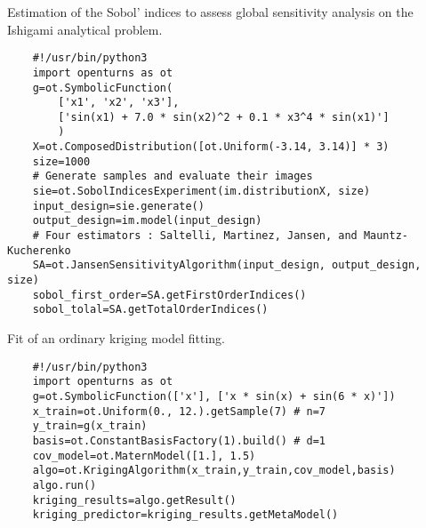 \begin{otexample_apx}
    Estimation of the Sobol' indices to assess global sensitivity analysis on the Ishigami analytical problem. 
    \lstset{style=mystyle, language=python}
%
\begin{lstlisting}
    #!/usr/bin/python3
    import openturns as ot
    g=ot.SymbolicFunction(
        ['x1', 'x2', 'x3'], 
        ['sin(x1) + 7.0 * sin(x2)^2 + 0.1 * x3^4 * sin(x1)']
        )
    X=ot.ComposedDistribution([ot.Uniform(-3.14, 3.14)] * 3)
    size=1000
    # Generate samples and evaluate their images
    sie=ot.SobolIndicesExperiment(im.distributionX, size)
    input_design=sie.generate()
    output_design=im.model(input_design)
    # Four estimators : Saltelli, Martinez, Jansen, and Mauntz-Kucherenko
    SA=ot.JansenSensitivityAlgorithm(input_design, output_design, size)
    sobol_first_order=SA.getFirstOrderIndices()
    sobol_tolal=SA.getTotalOrderIndices()
\end{lstlisting}
%
\end{otexample_apx}



\begin{otexample_apx}
    Fit of an ordinary kriging model fitting. 
    \lstset{style=mystyle, language=python}
%
\begin{lstlisting}
    #!/usr/bin/python3
    import openturns as ot
    g=ot.SymbolicFunction(['x'], ['x * sin(x) + sin(6 * x)'])
    x_train=ot.Uniform(0., 12.).getSample(7) # n=7
    y_train=g(x_train)
    basis=ot.ConstantBasisFactory(1).build() # d=1
    cov_model=ot.MaternModel([1.], 1.5)
    algo=ot.KrigingAlgorithm(x_train,y_train,cov_model,basis)
    algo.run()
    kriging_results=algo.getResult()
    kriging_predictor=kriging_results.getMetaModel()
\end{lstlisting}
%
\end{otexample_apx}
